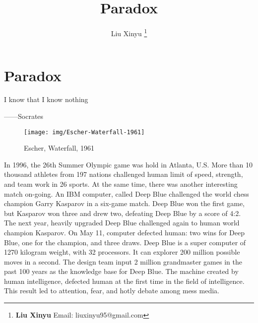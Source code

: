 \documentclass[b5paper]{article}
\begin{document}
\title{Paradox}

\author{Liu Xinyu
\thanks{{\bfseries Liu Xinyu} \newline
  Email: liuxinyu95@gmail.com \newline}
  }

\maketitle
\fi


\ifx\wholebook\relax
\chapter{Paradox}
\fi

\epigraph{I know that I know nothing}{——Socrates}

\begin{figure}[htbp]
 \centering
 \texttt{[image: img/Escher-Waterfall-1961]}
 \captionsetup{labelformat=empty}
 \caption{Escher, Waterfall, 1961}
 \label{fig:Escher-Waterfall}
\end{figure}

In 1996, the 26th Summer Olympic game was hold in Atlanta, U.S. More than 10 thousand athletes from 197 nations challenged human limit of speed, strength, and team work in 26 sports. At the same time, there was another interesting match on-going. An IBM computer, called Deep Blue challenged the world chess champion Garry Kasparov in a six-game match. Deep Blue won the first game, but Kasparov won three and drew two, defeating Deep Blue by a score of 4:2. The next year, heavily upgraded Deep Blue challenged again to human world champion Kasparov. On May 11, computer defected human: two wins for Deep Blue, one for the champion, and three draws. Deep Blue is a super computer of 1270 kilogram weight, with 32 processors. It can explorer 200 million possible moves in a second. The design team input 2 million grandmaster games in the past 100 years as the knowledge base for Deep Blue. The machine created by human intelligence, defected human at the first time in the field of intelligence. This result led to attention, fear, and hotly debate among mess media.
\end{document}
